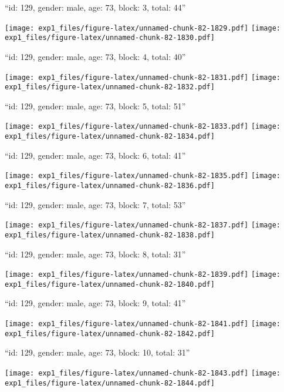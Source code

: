 \documentclass[11pt,,]{article}
\begin{document}
\newpage
[1] 

``id: 129, gender: male, age: 73, block: 3, total: 44''

\texttt{[image: exp1\_files/figure-latex/unnamed-chunk-82-1829.pdf]}
\texttt{[image: exp1\_files/figure-latex/unnamed-chunk-82-1830.pdf]}

\newpage
[1] 

``id: 129, gender: male, age: 73, block: 4, total: 40''

\texttt{[image: exp1\_files/figure-latex/unnamed-chunk-82-1831.pdf]}
\texttt{[image: exp1\_files/figure-latex/unnamed-chunk-82-1832.pdf]}

\newpage
[1] 

``id: 129, gender: male, age: 73, block: 5, total: 51''

\texttt{[image: exp1\_files/figure-latex/unnamed-chunk-82-1833.pdf]}
\texttt{[image: exp1\_files/figure-latex/unnamed-chunk-82-1834.pdf]}

\newpage
[1] 

``id: 129, gender: male, age: 73, block: 6, total: 41''

\texttt{[image: exp1\_files/figure-latex/unnamed-chunk-82-1835.pdf]}
\texttt{[image: exp1\_files/figure-latex/unnamed-chunk-82-1836.pdf]}

\newpage
[1] 

``id: 129, gender: male, age: 73, block: 7, total: 53''

\texttt{[image: exp1\_files/figure-latex/unnamed-chunk-82-1837.pdf]}
\texttt{[image: exp1\_files/figure-latex/unnamed-chunk-82-1838.pdf]}

\newpage
[1] 

``id: 129, gender: male, age: 73, block: 8, total: 31''

\texttt{[image: exp1\_files/figure-latex/unnamed-chunk-82-1839.pdf]}
\texttt{[image: exp1\_files/figure-latex/unnamed-chunk-82-1840.pdf]}

\newpage
[1] 

``id: 129, gender: male, age: 73, block: 9, total: 41''

\texttt{[image: exp1\_files/figure-latex/unnamed-chunk-82-1841.pdf]}
\texttt{[image: exp1\_files/figure-latex/unnamed-chunk-82-1842.pdf]}

\newpage
[1] 

``id: 129, gender: male, age: 73, block: 10, total: 31''

\texttt{[image: exp1\_files/figure-latex/unnamed-chunk-82-1843.pdf]}
\texttt{[image: exp1\_files/figure-latex/unnamed-chunk-82-1844.pdf]}
\end{document}
